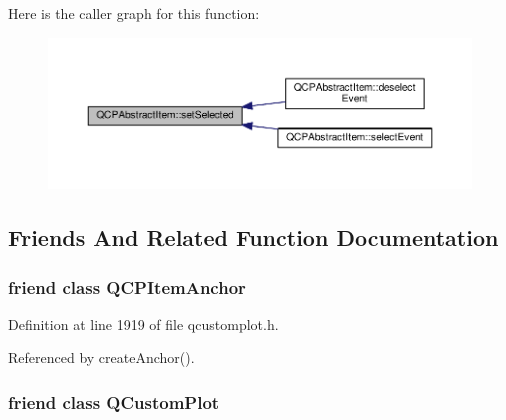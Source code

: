 Here is the caller graph for this function\+:\nopagebreak
\begin{figure}[H]
\begin{center}
\leavevmode
\includegraphics[width=350pt]{class_q_c_p_abstract_item_a203de94ad586cc44d16c9565f49d3378_icgraph}
\end{center}
\end{figure}




\subsection{Friends And Related Function Documentation}
\hypertarget{class_q_c_p_abstract_item_a61767d414fd57af9eb1741b34268c7fc}{}
\subsubsection[{Q\+C\+P\+Item\+Anchor}]{\setlength{\rightskip}{0pt plus 5cm}friend class {\bf Q\+C\+P\+Item\+Anchor}\hspace{0.3cm}{\ttfamily [friend]}}\label{class_q_c_p_abstract_item_a61767d414fd57af9eb1741b34268c7fc}


Definition at line 1919 of file qcustomplot.\+h.



Referenced by create\+Anchor().

\hypertarget{class_q_c_p_abstract_item_a1cdf9df76adcfae45261690aa0ca2198}{}
\subsubsection[{Q\+Custom\+Plot}]{\setlength{\rightskip}{0pt plus 5cm}friend class {\bf Q\+Custom\+Plot}\hspace{0.3cm}{\ttfamily [friend]}}\label{class_q_c_p_abstract_item_a1cdf9df76adcfae45261690aa0ca2198}


